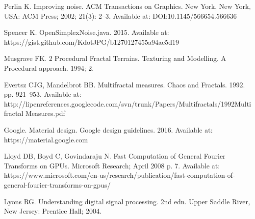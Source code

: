 Perlin K. Improving noise. ACM Transactions on Graphics. New York, New York, USA: ACM Press; 2002; 21(3): 2--3. Available at: DOI:10.1145/566654.566636

Spencer K. OpenSimplexNoise.java. 2015. Available at: https://gist.github.com/KdotJPG/b1270127455a94ac5d19

Musgrave FK. 2 Procedural Fractal Terrains. Texturing and Modelling. A Procedural approach. 1994;  2.

Evertsz CJG, Mandelbrot BB. Multifractal measures. Chaos and Fractals. 1992. pp. 921--953. Available at: http://lipenreferences.googlecode.com/svn/trunk/Papers/Multifractals/1992Multifractal Measures.pdf

Google. Material design. Google design guidelines. 2016. Available at: https://material.google.com

Lloyd DB, Boyd C, Govindaraju N. Fast Computation of General Fourier Transforms on GPUs. Microsoft Research; April 2008 p. 7. Available at: https://www.microsoft.com/en-us/research/publication/fast-computation-of-general-fourier-transforms-on-gpus/

Lyons RG. Understanding digital signal processing. 2nd edn. Upper Saddle River, New Jersey: Prentice Hall; 2004.

